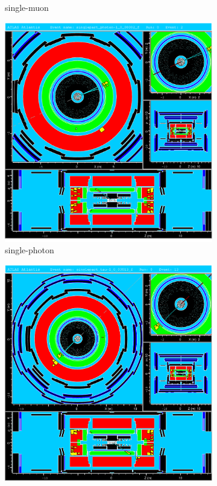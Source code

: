 \begin{figure}[h]
\begin{subfigure}{0.45\textwidth}
		\caption{single-muon}
		\label{fig:LearningData_muon}
	\end{subfigure} 
	\hfill
	\begin{subfigure}{0.45\textwidth}
    		\includegraphics[width=\textwidth]{../figures/LearningData_photon.pdf}
		\caption{single-photon}
		\label{fig:LearningData_photon}
	\end{subfigure} 
	\hfill
	\begin{subfigure}{0.45\textwidth}
		\includegraphics[width=\textwidth]{../figures/LearningData_tau.pdf}

\end{subfigure}
\end{figure}
